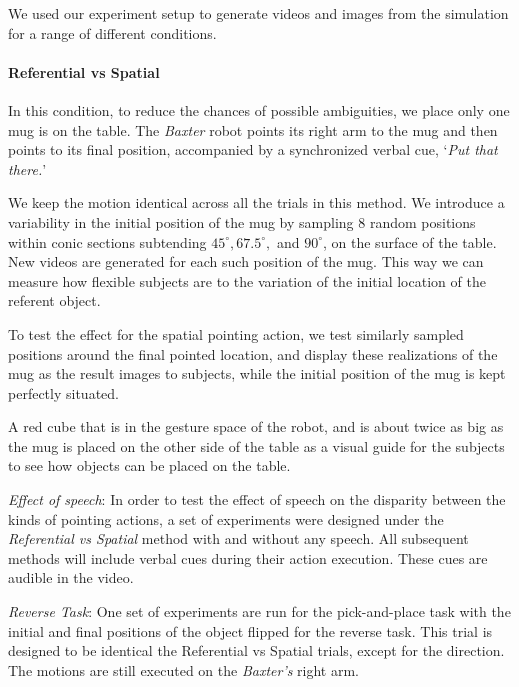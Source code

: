 We used our experiment setup to generate videos and images from the simulation for a range of different conditions.

\paragraph{Referential vs Spatial}
In this condition, to reduce the chances of possible ambiguities, we place only one mug is on the table. The \textit{Baxter} robot points its right arm to the mug and then points to its final position, accompanied by a synchronized verbal cue, `\textit{Put that there.}'


We keep the motion identical across all the trials in this method. 
We introduce a variability in the initial position of the mug by sampling $8$ random positions within conic sections subtending $45^{\circ} , 67.5^{\circ}, $ and $90^{\circ}$, on the surface of the table. New videos are generated for each such position of the mug.
This way we can measure how flexible subjects are to the variation of the initial location of the referent object. 

To test the effect for the spatial pointing action, we test similarly sampled positions around the final pointed location, and display these realizations of the mug as the result images to subjects, while the initial position of the mug is kept perfectly situated. 

 A red cube that is in the gesture space of the robot, and is about twice as big as the mug is placed on the other side of the table as a visual guide for the subjects to see how objects can be placed on the table. 

\noindent\textit{Effect of speech}: In order to test the effect of speech on the disparity between the kinds of pointing actions, a set of experiments were designed under the \textit{Referential vs Spatial} method with and without any speech. All subsequent methods will include verbal cues during their action execution. These cues are audible in the video.

\noindent\textit{Reverse Task}: One set of experiments are run for the pick-and-place task with the initial and final positions of the object flipped for the reverse task. This trial is designed to be identical the Referential vs Spatial trials, except for the direction. The motions are still executed on the \textit{Baxter's} right arm. 

